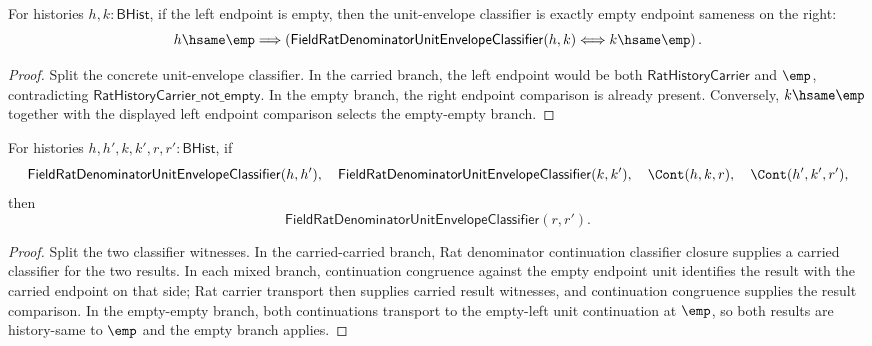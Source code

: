 \begin{theorem}
\label{thm:field-rat-denominator-unit-envelope-classifier-empty-left-endpoint-iff}
For histories $h,k:\mathsf{BHist}$, if the left endpoint is empty, then the
unit-envelope classifier is exactly empty endpoint sameness on the right:
$$
h\hsame\emp
\Longrightarrow
\left(
\mathsf{FieldRatDenominatorUnitEnvelopeClassifier}(h,k)
\Longleftrightarrow k\hsame\emp
\right).
$$
\end{theorem}
\begin{proof}
Split the concrete unit-envelope classifier. In the carried branch, the left
endpoint would be both $\mathsf{RatHistoryCarrier}$ and $\emp$, contradicting
$\mathsf{RatHistoryCarrier\_not\_empty}$. In the empty branch, the right
endpoint comparison is already present. Conversely, $k\hsame\emp$ together
with the displayed left endpoint comparison selects the empty-empty branch.
\end{proof}

\begin{theorem}
\label{thm:field-rat-denominator-unit-envelope-classifier-continuation-closed}
For histories $h,h',k,k',r,r':\mathsf{BHist}$, if
$$
\mathsf{FieldRatDenominatorUnitEnvelopeClassifier}(h,h'),\quad
\mathsf{FieldRatDenominatorUnitEnvelopeClassifier}(k,k'),\quad
\Cont(h,k,r),\quad
\Cont(h',k',r'),
$$
then
$$
\mathsf{FieldRatDenominatorUnitEnvelopeClassifier}(r,r').
$$
\end{theorem}
\begin{proof}
Split the two classifier witnesses. In the carried-carried branch, Rat
denominator continuation classifier closure supplies a carried classifier for
the two results. In each mixed branch, continuation congruence against the empty
endpoint unit identifies the result with the carried endpoint on that side; Rat
carrier transport then supplies carried result witnesses, and continuation
congruence supplies the result comparison. In the empty-empty branch, both
continuations transport to the empty-left unit continuation at $\emp$, so both
results are history-same to $\emp$ and the empty branch applies.
\end{proof}

